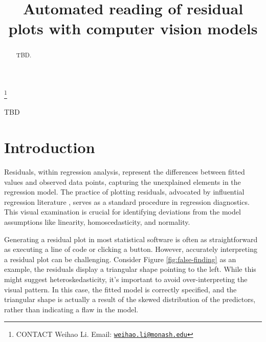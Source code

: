 \documentclass[]{interact}
\theoremstyle{plain}%
\theoremstyle{definition}
\theoremstyle{remark}
\begin{document}

\title{Automated reading of residual plots with computer vision models}


\author{
}

\thanks{CONTACT Weihao
Li. Email: \href{mailto:weihao.li@monash.edu}{\nolinkurl{weihao.li@monash.edu}}}

\maketitle

\begin{abstract}
TBD.
\end{abstract}

\begin{keywords}
TBD
\end{keywords}

\hypertarget{introduction}{%
\section{Introduction}\label{introduction}}

Residuals, within regression analysis, represent the differences between
fitted values and observed data points, capturing the unexplained
elements in the regression model. The practice of plotting residuals,
advocated by influential regression literature
\citep{cook1982residuals, draper1998applied, belsley1980regression, montgomery1982introduction},
serves as a standard procedure in regression diagnostics. This visual
examination is crucial for identifying deviations from the model
assumptions like linearity, homoscedasticity, and normality.

Generating a residual plot in most statistical software is often as
straightforward as executing a line of code or clicking a button.
However, accurately interpreting a residual plot can be challenging.
Consider Figure \ref{fig:false-finding} as an example, the residuals
display a triangular shape pointing to the left. While this might
suggest heteroskedasticity, it's important to avoid over-interpreting
the visual pattern. In this case, the fitted model is correctly
specified, and the triangular shape is actually a result of the skewed
distribution of the predictors, rather than indicating a flaw in the
model.
\end{document}
